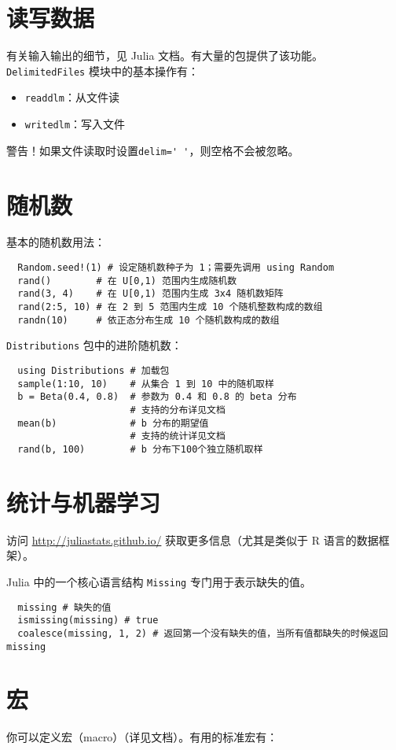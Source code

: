\documentclass[10pt,a4paper]{article}
\begin{document}
\section{读写数据}
有关输入输出的细节，见 Julia 文档。有大量的包提供了该功能。
\lstinline|DelimitedFiles| 模块中的基本操作有：
\begin{itemize}
  \item \lstinline|readdlm|：从文件读
  \item \lstinline|writedlm|：写入文件
\end{itemize}

警告！如果文件读取时设置\lstinline|delim=' '|，则空格不会被忽略。

\section{随机数}
基本的随机数用法：
\begin{lstlisting}
  Random.seed!(1) # 设定随机数种子为 1；需要先调用 using Random
  rand()        # 在 U[0,1) 范围内生成随机数
  rand(3, 4)    # 在 U[0,1) 范围内生成 3x4 随机数矩阵
  rand(2:5, 10) # 在 2 到 5 范围内生成 10 个随机整数构成的数组
  randn(10)     # 依正态分布生成 10 个随机数构成的数组
\end{lstlisting}

\lstinline|Distributions| 包中的进阶随机数：
\begin{lstlisting}
  using Distributions # 加载包
  sample(1:10, 10)    # 从集合 1 到 10 中的随机取样
  b = Beta(0.4, 0.8)  # 参数为 0.4 和 0.8 的 beta 分布
                      # 支持的分布详见文档
  mean(b)             # b 分布的期望值
                      # 支持的统计详见文档
  rand(b, 100)        # b 分布下100个独立随机取样
\end{lstlisting}

\section{统计与机器学习}
访问 \url{http://juliastats.github.io/} 获取更多信息（尤其是类似于 R 语言的数据框架）。

Julia 中的一个核心语言结构 \lstinline|Missing| 专门用于表示缺失的值。
\begin{lstlisting}
  missing # 缺失的值
  ismissing(missing) # true
  coalesce(missing, 1, 2) # 返回第一个没有缺失的值，当所有值都缺失的时候返回 missing
\end{lstlisting}

\section{宏}
你可以定义宏（macro）（详见文档）。有用的标准宏有：
\end{document}
